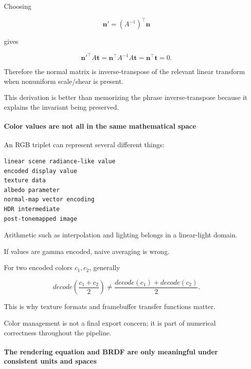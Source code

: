 Choosing

\[
\mathbf n'=(A^{-1})^\top\mathbf n
\]

gives

\[
{\mathbf n'}^\top A\mathbf t
=
\mathbf n^\top A^{-1}A\mathbf t
=
\mathbf n^\top\mathbf t
=
0.
\]

Therefore the normal matrix is inverse-transpose of the relevant linear transform when nonuniform scale/shear is present.

This derivation is better than memorizing the phrase inverse-transpose because it explains the invariant being preserved.

\paragraph{Color values are not all in the same mathematical space}\label{03-visual-computing-i-ch001-color-values-are-not-all-in-the-same-mathematical-space}

\hypertarget{03-visual-computing-i-ch001-color-values-are-not-all-in-the-same-mathematical-space}{}

An RGB triplet can represent several different things:

\begin{verbatim}
linear scene radiance-like value
encoded display value
texture data
albedo parameter
normal-map vector encoding
HDR intermediate
post-tonemapped image
\end{verbatim}

Arithmetic such as interpolation and lighting belongs in a linear-light domain.

If values are gamma encoded, naive averaging is wrong.

For two encoded colors \(c_1,c_2\), generally

\[
decode\left(
\frac{c_1+c_2}{2}
\right)
\neq
\frac{decode(c_1)+decode(c_2)}{2}.
\]

This is why texture formats and framebuffer transfer functions matter.

Color management is not a final export concern; it is part of numerical correctness throughout the pipeline.

\paragraph{The rendering equation and BRDF are only meaningful under consistent units and spaces}\label{03-visual-computing-i-ch001-the-rendering-equation-and-brdf-are-only-meaningful-under-consistent-units-and-spaces}

